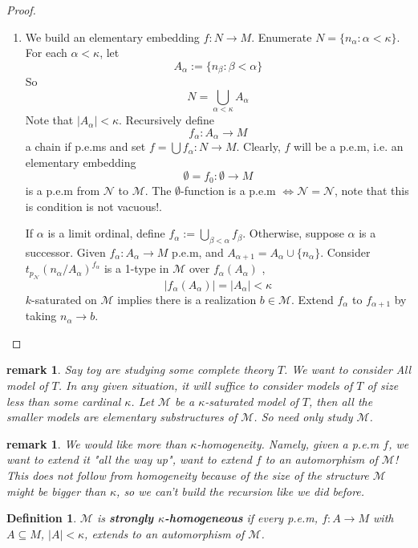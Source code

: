 \documentclass[letterpaper, 12pt]{article}
\newcommand{\fin}{\qquad \quad \hfill \framebox[1.75mm][l]{\,}}
\newcommand{\cM}{\mathcal{M}}
\newcommand{\cN}{\mathcal{N}}
\theoremstyle{stdthm}
\theoremstyle{stddef}
\newtheorem{defn}[thm]{Definition}
\newtheorem{rem}[thm]{remark} %
\theoremstyle{stdnonum}
\theoremstyle{stdqands}
\theoremstyle{stdbold}
\begin{document}
\begin{proof}
\begin{enumerate}
\item We build an elementary embedding $f:N \to M$. Enumerate $N = \{n_\alpha: \alpha < \kappa\}$. For each $\alpha < \kappa$, let 
\[ A_\alpha:= \{n_\beta: \beta < \alpha \}\]
So 
\[ N = \bigcup_{\alpha < \kappa} A_\alpha \] 
Note that $|A_\alpha|<\kappa$. Recursively define 
\[ f_\alpha: A_\alpha \to M \]
a chain if p.e.ms and set $f = \bigcup f_\alpha: N \to M$. Clearly, $f$ will be a p.e.m, i.e. an elementary embedding 
\[ \emptyset= f_0: \emptyset \to M \]
is a p.e.m from $\cN$ to $\cM$. The $\emptyset$-function is a p.e.m $\Leftrightarrow \cN = \cN$, note that this is condition is not vacuous!.

If $\alpha$ is a limit ordinal, define $f_\alpha:= \bigcup_{\beta < \alpha} f_\beta$. Otherwise, suppose $\alpha$ is a successor. Given $f_\alpha: A_\alpha \to M$ p.e.m, and $A_{\alpha + 1} = A_\alpha \cup \{n_\alpha\}$.  Consider $t_{p_\cN}(n_\alpha / A_\alpha)^{f_\alpha}$ is a 1-type in $\cM$ over $f_\alpha(A_\alpha)$ ,
\[ |f_\alpha(A_\alpha)| = |A_\alpha| < \kappa \]
$k$-saturated on $\cM$ implies there is a realization $b \in \cM$. Extend $f_\alpha$ to $f_{\alpha+1}$ by taking $n_\alpha \to b$. 
\end{enumerate}

\end{proof}

\begin{rem}
Say toy are studying some complete theory $T$. We want to consider \emph{All} model of $T$. In any given situation, it will suffice to consider models of $T$ of size less than some cardinal $\kappa$. Let $\cM$ be a $\kappa$-saturated model of $T$, then all the smaller models are elementary substructures of $\cM$. So need only study $\cM$. 
\end{rem}

\begin{rem}
We would like more than $\kappa$-homogeneity. Namely, given a p.e.m $f$, we want to extend it "all the way up", want to extend $f$ to an automorphism of $\cM$! This does not follow from homogeneity because of the size of the structure $\cM$ might be bigger than $\kappa$, so we can't build the recursion like we did before. 
\end{rem}

\begin{defn}
$\cM$ is {\bf strongly $\kappa$-homogeneous} if every p.e.m, $f:A \to M$ with $A \subseteq M$, $|A| <\kappa$, extends to an automorphism of $\cM$. 
\end{defn}
\end{document}
